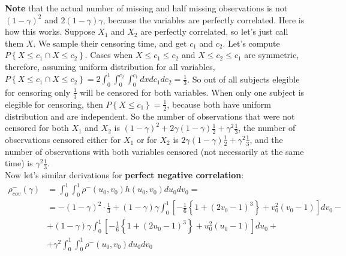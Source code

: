 \documentclass[]{article}
\begin{document}
\textbf{Note} that the actual number of missing and half missing observations is not $(1-\gamma)^2$ and $2(1-\gamma)\gamma$, because the variables are perfectly correlated. Here is how this works. Suppose $X_1$ and $X_2$ are perfectly correlated, so let's just call them $X$. We sample their censoring time, and get $c_1$ and $c_2$. Let's compute $P\left\{ X \leq c_1 \cap X \leq c_2 \right\}$. Cases when $X \leq c_1 \leq c_2$ and $X \leq c_2 \leq c_1$ are symmetric, therefore, assuming uniform distribution for all variables, $P\left\{ X \leq c_1 \cap X \leq c_2 \right\} = 2 \int_0^1 \int_0^{c_2} \int_0^{c_1} dx dc_1 dc_2 = \frac{1}{3}$. So out of all subjects elegible for censoring only $\frac{1}{3}$ will be censored for both variables. When only one subject is elegible for censoring, then $P\left\{ X \leq c_1 \right\} = \frac{1}{2}$, because both have uniform distribution and are independent. So the number of observations that were not censored for both $X_1$ and $X_2$ is $(1 - \gamma)^2 + 2\gamma (1-\gamma) \frac{1}{2} + \gamma^2 \frac{1}{3}$, the number of observations censored either for $X_1$ or for $X_2$ is $2\gamma (1-\gamma) \frac{1}{2} + \gamma^2 \frac{1}{3}$, and the number of observations with both variables censored (not necessarily at the same time) is $\gamma^2 \frac{1}{3}$.
~\\

Now let's similar derivations for \textbf{perfect negative correlation}:
	$$
	\begin{aligned}
    \rho^-_{cov}(\gamma) &= \int_0^1 \int_0^1 \rho^-(u_0, v_0) h(u_0, v_0) du_0 dv_0= \\
       &= -(1-\gamma)^2\cdot \frac{1}{3} + (1-\gamma)\gamma \int_0^1 \left[     -\frac{1}{6}\left\{ 1 + (2v_0 - 1)^3  \right\}   +   v_0^2 (v_0 - 1)  \right] dv_0 - \\
       & + (1-\gamma)\gamma \int_0^1 \left[     -\frac{1}{6}\left\{ 1 + (2u_0 - 1)^3  \right\} +   u_0^2 (u_0 - 1)  \right] du_0  + \\
       &+\gamma^2\int_0^1 \int_0^1 \rho^-(u_0, v_0) du_0 dv_0
	\end{aligned}
	$$
\end{document}
